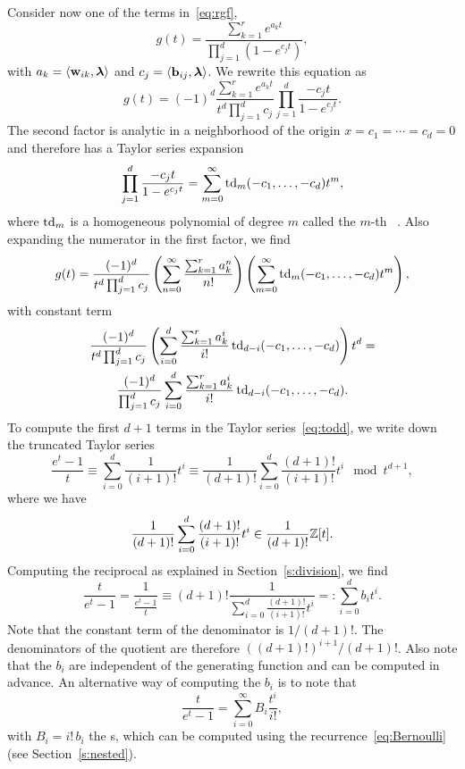 Consider now one of the terms in~\eqref{eq:rgf},
$$
g(t) =
    \frac{\sum_{k=1}^{r} e^{a_k t}}
	 {\prod_{j=1}^{d}\left(1-e^{c_j t}\right)}
,
$$
with $a_k = \sp{w_{ik}}{\lambda}$ and $c_j = \sp{b_{ij}}{\lambda}$.
We rewrite this equation as
$$
g(t) =
(-1)^d
    \frac{\sum_{k=1}^{r} e^{a_k t}}
	 {t^d \prod_{j=1}^d c_j}
    \prod_{j=1}^d \frac{-c_j t}
	 {1-e^{c_j t}}
.
$$
The second factor is analytic in a neighborhood of the origin
$x = c_1 = \cdots = c_d = 0$ and therefore has a Taylor series expansion
\begin{equation}
\label{eq:todd}
    \prod_{j=1}^d \frac{-c_j t}
	 {1-e^{c_j t}}
=
    \sum_{m=0}^{\infty} \todd_m(-c_1, \ldots, -c_d) t^m
,
\end{equation}
where $\operatorname{td}_m$ is a homogeneous polynomial of degree $m$ called
the $m$-th ~\cite{Barvinok1999}.
Also expanding the numerator in the first factor, we find
$$
g(t)  = \frac{(-1)^d}{t^d \prod_{j=1}^d c_j}
	    \left(
		\sum_{n=0}^{\infty}\frac{\sum_{k=1}^{r} a_k^n}{n!}
	    \right)
	    \left(
		\sum_{m=0}^{\infty} \operatorname{td}_m(-c_1, \ldots, -c_d) t^m
	    \right)
,
$$
with constant term
\begin{multline}
\label{eq:todd:constant}
\frac{(-1)^d}{t^d \prod_{j=1}^d c_j}
    \left(\sum_{i=0}^d \frac{\sum_{k=1}^{r} a_k^i}{i!}
		    \todd_{d-i}(-c_1, \ldots, -c_d)\right)t^d
= \\
\frac{(-1)^d}{\prod_{j=1}^d c_j}
    \sum_{i=0}^d \frac{\sum_{k=1}^{r} a_k^i}{i!} \todd_{d-i}(-c_1, \ldots, -c_d)
.
\end{multline}
To compute the first $d+1$ terms in the Taylor series~\eqref{eq:todd},
we write down the truncated Taylor series
$$
\frac{e^t -1}t \equiv
	\sum_{i=0}^d \frac 1{(i+1)!} t^i \equiv
	\frac 1 {(d+1)!} \sum_{i=0}^d \frac{(d+1)!}{(i+1)!} t^i
\mod t^{d+1}
,
$$
where we have
$$
	\frac 1 {(d+1)!} \sum_{i=0}^d \frac{(d+1)!}{(i+1)!} t^i
		\in \frac 1{(d+1)!} \mathbb{Z}[t]
.
$$
Computing the reciprocal as explained in Section~\ref{s:division},
we find
\begin{equation}
\label{eq:t-exp-1}
\frac{t}{e^t-1} = \frac 1{\frac{e^t -1}t}
\equiv (d+1)! \frac 1{\sum_{i=0}^d \frac{(d+1)!}{(i+1)!} t^i}
=: \sum_{i=0}^d b_i t^i
.
\end{equation}
Note that the constant term of the denominator is $1/(d+1)!$.
The denominators of the quotient are therefore $((d+1)!)^{i+1}/(d+1)!$.
Also note that the $b_i$ are independent of the generating function
and can be computed in advance.
An alternative way of computing the $b_i$ is to note that
$$
\frac{t}{e^t-1} = \sum_{i=0}^\infty B_i \frac{t^i}{i!}
,
$$
with $B_i = i! \, b_i$ the s, which can be computed
using the recurrence~\eqref{eq:Bernoulli} (see Section~\ref{s:nested}).

